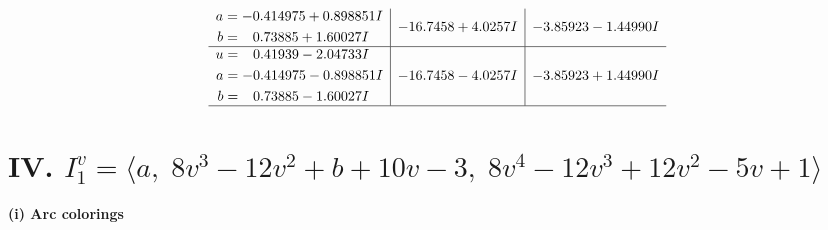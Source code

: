 \documentclass[1p]{elsarticle_modified}
\theoremstyle{definition}
\begin{document}
$$\begin{array}{c|c|c}
\begin{aligned}
a &= -0.414975 + 0.898851 I \\
b &= \phantom{-}0.73885 + 1.60027 I\end{aligned}
 & -16.7458 + 4.0257 I & -3.85923 - 1.44990 I \\ \hline\begin{aligned}
u &= \phantom{-}0.41939 - 2.04733 I \\
a &= -0.414975 - 0.898851 I \\
b &= \phantom{-}0.73885 - 1.60027 I\end{aligned}
 & -16.7458 - 4.0257 I & -3.85923 + 1.44990 I\\
 \hline 
 \end{array}$$\newpage\newpage\renewcommand{\arraystretch}{1}
\centering \section*{IV. $I^v_{1}= \langle a,\;8 v^3-12 v^2+b+10 v-3,\;8 v^4-12 v^3+12 v^2-5 v+1 \rangle$}
\flushleft \textbf{(i) Arc colorings}\\
\end{document}

